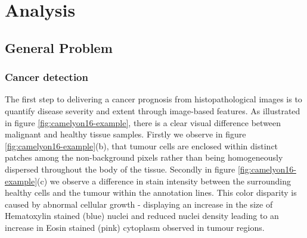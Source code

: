 \documentclass{l4proj}
\begin{document}
\chapter{Analysis}
\section{General Problem}
\subsection{Cancer detection} \label{cancer-general-problem}
The first step to delivering a cancer prognosis from histopathological images is to quantify disease severity and extent through image-based features. As illustrated in figure \ref{fig:camelyon16-example}, there is a clear visual difference between malignant and healthy tissue samples. Firstly we observe in figure \ref{fig:camelyon16-example}(b), that tumour cells are enclosed within distinct patches among the non-background pixels rather than being homogeneously dispersed throughout the body of the tissue. Secondly in figure \ref{fig:camelyon16-example}(c) we observe a difference in stain intensity between the surrounding healthy cells and the tumour within the annotation lines. This color disparity is caused by abnormal cellular growth - displaying an increase in the size of Hematoxylin stained (blue) nuclei and reduced nuclei density leading to an increase in Eosin stained (pink) cytoplasm observed in tumour regions. 
\end{document}
